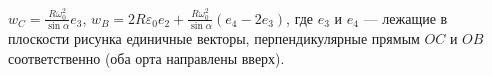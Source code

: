 $w_C = \frac{R\omega ^2_0}{\sin{\alpha}}e_3$,
$w_B = 2R\varepsilon _0 e_2 + \frac{R\omega _0^2}{\sin{\alpha}}(e_4 - 2e_3)$,
где $e_3$ и $e_4$ --- лежащие в плоскости рисунка единичные векторы,
перпендикулярные прямым $OC$ и $OB$ соответственно
(оба орта направлены вверх).
